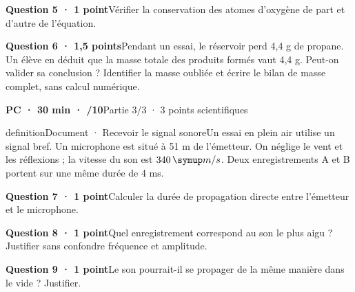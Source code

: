 \par\addvspace{3mm}\noindent\begin{minipage}{\linewidth}\textbf{Question 5 · 1 point}\quad Vérifier la conservation des atomes d’oxygène de part et d’autre de l’équation.\par\end{minipage}\par
\par\addvspace{3mm}\noindent\begin{minipage}{\linewidth}\textbf{Question 6 · 1,5 points}\quad Pendant un essai, le réservoir perd 4,4 g de propane. Un élève en déduit que la masse totale des produits formés vaut 4,4 g. Peut-on valider sa conclusion ? Identifier la masse oubliée et écrire le bilan de masse complet, sans calcul numérique.\par\end{minipage}\par
\vfill{}
\textbf{PC · 30 min · /10}\hfill Partie 3/3 · 3 points scientifiques
\begin{pcEncadre}{definition}{Document · Recevoir le signal sonore}Un essai en plein air utilise un signal bref. Un microphone est situé à 51 m de l’émetteur. On néglige le vent et les réflexions ; la vitesse du son est $340\unite{m/s}$. Deux enregistrements A et B portent sur une même durée de 4 ms.\end{pcEncadre}
\par\addvspace{3mm}\noindent\begin{minipage}{\linewidth}\textbf{Question 7 · 1 point}\quad Calculer la durée de propagation directe entre l’émetteur et le microphone.\par\end{minipage}\par
\par\addvspace{3mm}\noindent\begin{minipage}{\linewidth}\textbf{Question 8 · 1 point}\quad Quel enregistrement correspond au son le plus aigu ? Justifier sans confondre fréquence et amplitude.\par\end{minipage}\par
\par\addvspace{3mm}\noindent\begin{minipage}{\linewidth}\textbf{Question 9 · 1 point}\quad Le son pourrait-il se propager de la même manière dans le vide ? Justifier.\par\end{minipage}\par

